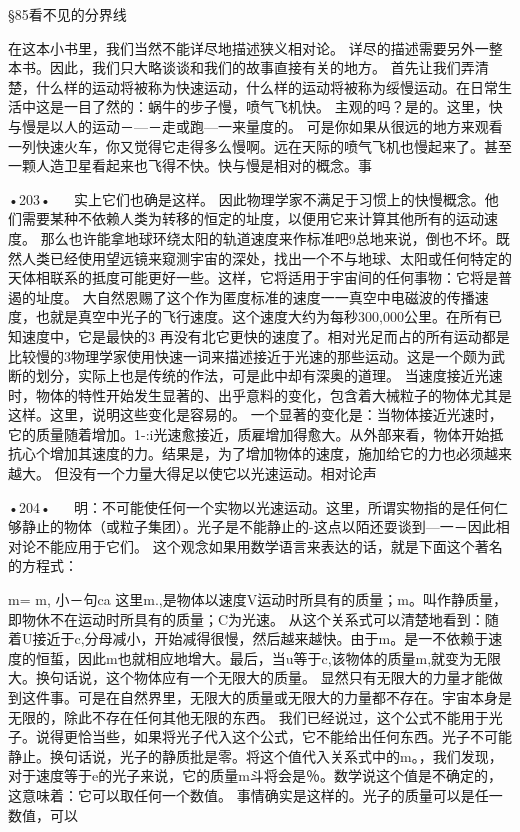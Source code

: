 §85看不见的分界线

在这本小书里，我们当然不能详尽地描述狭义相对论。
详尽的描述需要另外一整本书。因此，我们只大略谈谈和我们的故事直接有关的地方。
首先让我们弄清楚，什么样的运动将被称为快速运动，什么样的运动将被称为绥慢运动。在日常生活中这是一目了然的：蜗牛的步子慢，喷气飞机快。
主观的吗？是的。这里，快与慢是以人的运动－—－走或跑—一来量度的。
可是你如果从很远的地方来观看一列快速火车，你又觉得它走得多么慢啊。远在天际的喷气飞机也慢起来了。甚至一颗人造卫星看起来也飞得不快。快与慢是相对的概念。事

•203•
  
实上它们也确是这样。
因此物理学家不满足于习惯上的快慢概念。他们需要某种不依赖人类为转移的恒定的址度，以便用它来计算其他所有的运动速度。
那么也许能拿地球环绕太阳的轨道速度来作标准吧9总地来说，倒也不坏。既然人类已经使用望远镜来窥测宇宙的深处，找出一个不与地球、太阳或任何特定的天体相联系的抵度可能更好一些。这样，它将适用于宇宙间的任何事物：它将是普遏的址度。
大自然恩赐了这个作为匿度标准的速度一一真空中电磁波的传播速度，也就是真空中光子的飞行速度。这个速度大约为每秒300,000公里。在所有已知速度中，它是最快的3
再没有北它更快的速度了。相对光足而占的所有运动都是比较慢的3物理学家使用快速一词来描述接近于光速的那些运动。这是一个颇为武断的划分，实际上也是传统的作法，可是此中却有深奥的道理。
当速度接近光速时，物体的特性开始发生显著的、出乎意料的变化，包含着大械粒子的物体尤其是这样。这里，说明这些变化是容易的。
一个显著的变化是：当物体接近光速时，它的质量随着增加。1-:i光速愈接近，质雇增加得愈大。从外部来看，物体开始抵抗心个增加其速度的力。结果是，为了增加物体的速度，施加给它的力也必须越来越大。
但没有一个力量大得足以使它以光速运动。相对论声

•204•
  
明：不可能使任何一个实物以光速运动。这里，所谓实物指的是任何仁够静止的物体（或粒子集团）。光子是不能静止的-这点以陌还耍谈到—一－因此相对论不能应用于它们。
这个观念如果用数学语言来表达的话，就是下面这个著名的方程式：

m=
m,
小－句ca
这里m.,是物体以速度V运动时所具有的质量；m。叫作静质量，即物休不在运动时所具有的质量；C为光速。
从这个关系式可以清楚地看到：随着U接近于c,分母减小，开始减得很慢，然后越来越快。由于m。是一不依赖于速度的恒蜇，因此m也就相应地增大。最后，当u等于c,该物体的质量m,就变为无限大。换句话说，这个物体应有一个无限大的质量。
显然只有无限大的力量才能做到这件事。可是在自然界里，无限大的质量或无限大的力量都不存在。宇宙本身是无限的，除此不存在任何其他无限的东西。
我们已经说过，这个公式不能用于光子。说得更恰当些，如果将光子代入这个公式，它不能给出任何东西。光子不可能静止。换句话说，光子的静质批是零。将这个值代入关系式中的m。，我们发现，对于速度等于e的光子来说，它的质量m斗将会是％。数学说这个值是不确定的，这意味着：它可以取任何一个数值。
事情确实是这样的。光子的质量可以是任一数值，可以

